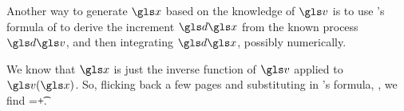 Another way to generate $\x$ based on the knowledge of $\gv$ is to use \Ito's formula of \secref{} to derive the increment $\gd\x$ from the known \Ito process $\gd\gv$, and then integrating $\gd\x$, possibly numerically.

We know that $\x$ is just the inverse function of $\gv$ applied to $\gv(\x)$. So, flicking back a few pages and substituting in \Ito's formula, \eref{}, 
we find
\be
\gd\x=\gd\t+\sigma\gd\gW.
\ee

%
%
